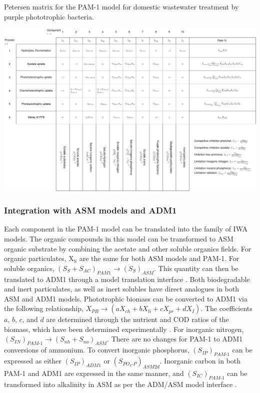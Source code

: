  \begin{table}
    \caption{Petersen matrix for the PAM-1 model for domestic wastewater treatment by purple phototrophic bacteria.}
    \label{tab:petersen}
    \includegraphics[width=1\linewidth]{Tables/petersen/petersen.pdf}
\end{table}

\subsubsection{Integration with ASM models and ADM1}
Each component in the PAM-1 model can be translated into the family of IWA models. The organic compounds in this model can be transformed to ASM organic substrate by combining the acetate and other soluble organics fields. For organic particulates, $\mathrm{X_S}$ are the same for both ASM models and PAM-1. For soluble organics, $\left(S_S + S_{AC}\right)_{PAM1} \rightarrow \left(S_S\right)_{ASM}$. This quantity can then be translated to ADM1 through a model translation interface \cite{Nopens2009}. Both biodegradable and inert particulates, as well as inert solubles have direct analogues in both ASM and ADM1 models. Phototrophic biomass can be converted to ADM1 via the following relationship, $X_{PB} \rightarrow \left(aX_{ch} + bX_{li} + cX_{pr} + dX_I \right)$. The coefficients $a$, $b$, $c$, and $d$ are determined through the nutrient and COD ratios of the biomass, which have been determined experimentally \cite{Hulsen2014}. For inorganic nitrogen, $\left(S_{IN}\right)_{PAM\mbox{-}1} \rightarrow \left(S_{nh} + S_{no}\right)_{ASM}$. There are no changes for PAM-1 to ADM1 conversions of ammonium. To convert inorganic phosphorus, $\left(S_{IP}\right)_{PAM\mbox{-}1}$ can be expressed as either $\left(S_{IP}\right)_{ADM1}$ or $\left(S_{PO_4\mbox{-}P}\right)_{ASM2d}$. Inorganic carbon in both PAM-1 and ADM1 are expressed in the same manner, and $\left(S_{IC}\right)_{PAM\mbox{-}1}$ can be transformed into alkalinity in ASM as per the ADM/ASM model interface \cite{Nopens2009}.

